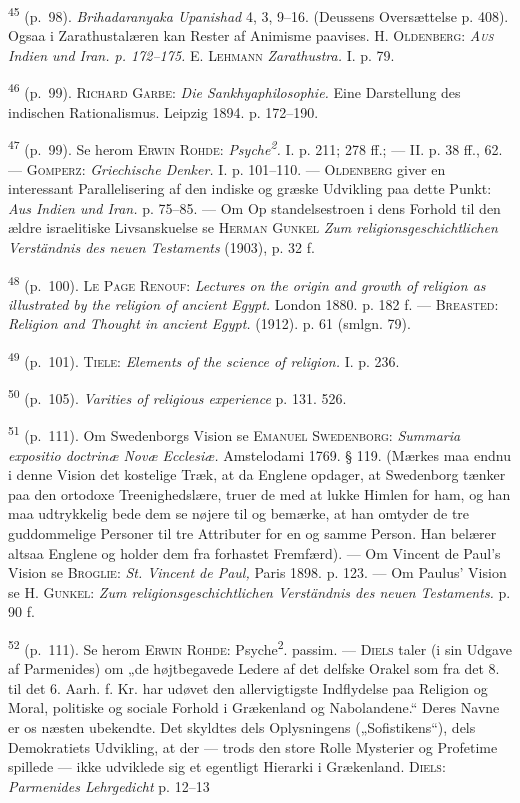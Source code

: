 \documentclass[12pt,a4paper,openany]{book}
\newcommand{\opage}[1]{\marginnote{\footnotesize\textit{[#1]}}}
\begin{document}
\begin{small}
\textsuperscript{45} (p.~98). \textit{Brihadaranyaka Upanishad} 4, 3,
9--16. (Deussens Oversættelse p.
408). Ogsaa i Zarathustalæren kan Rester af Animisme paavises. H.
\textsc{Oldenberg}: \textit{\textsc{Aus}} \textit{Indien und Iran. p.
172--175.} E. \textsc{Lehmann} \textit{Zarathustra.} I. p. 79.

\textsuperscript{46} (p.~99). \textsc{Richard Garbe}: \textit{Die
Sankhyaphilosophie.} Eine
Darstellung des indischen Rationalismus. Leipzig 1894. p. 172--190.

\textsuperscript{47} (p.~99). Se herom \textsc{Erwin Rohde}:
\textit{Psyche\textsuperscript{2}.} I. p.
211; 278 ff.; --- II. p. 38 ff., 62. --- \textsc{Gomperz}:
\textit{Griechische Denker.} I. p. 101--110. --- \textsc{Oldenberg}
giver en interessant Parallelisering af den indiske og græske Udvikling
paa dette Punkt: \textit{Aus Indien und Iran.} p. 75--85. --- Om Op%
\opage{250}standelsestroen i dens Forhold til den ældre israelitiske
Livsanskuelse se \textsc{Herman Gunkel} \textit{Zum
religionsgeschichtlichen Verständnis des neuen Testaments} (1903), p. 32
f.

\textsuperscript{48} (p.~100). \textsc{Le Page Renouf}: \textit{Lectures
on the origin and growth of
religion as illustrated by the religion of ancient Egypt.} London 1880.
p. 182 f. --- \textsc{Breasted}: \textit{Religion and Thought in ancient
Egypt.} (1912). p. 61 (smlgn. 79).

\textsuperscript{49} (p.~101). \textsc{Tiele}: \textit{Elements of the
science of religion.} I. p. 236.

\textsuperscript{50} (p.~105). \textit{Varities of religious experience}
p. 131. 526.

\textsuperscript{51} (p.~111). Om Swedenborgs Vision se \textsc{Emanuel
Swedenborg}: \textit{Summaria
expositio doctrinæ Novæ Ecclesiæ.} Amstelodami 1769. § 119. (Mærkes maa
endnu i denne Vision det kostelige Træk, at da Englene opdager, at
Swedenborg tænker paa den ortodoxe Treenighedslære, truer de med at
lukke Himlen for ham, og han maa udtrykkelig bede dem se nøjere til og
bemærke, at han omtyder de tre guddommelige Personer til tre Attributer
for en og samme Person. Han belærer altsaa Englene og holder dem fra
forhastet Fremfærd). --- Om Vincent de Paul’s Vision se
\textsc{Broglie}: \textit{St. Vincent de Paul,} Paris 1898. p. 123. ---
Om Paulus’ Vision se H. \textsc{Gunkel}: \textit{Zum
religionsgeschichtlichen Verständnis des neuen Testaments.} p. 90 f.

\textsuperscript{52} (p.~111). Se herom \textsc{Erwin Rohde}:
Psyche\textsuperscript{2}. passim. ---
\textsc{Diels} taler (i sin Udgave af Parmenides) om „de højtbegavede
Ledere af det delfske Orakel som fra det 8. til det 6. Aarh. f. Kr. har
udøvet den allervigtigste Indflydelse paa Religion og Moral, politiske
og sociale Forhold i Grækenland og Nabolandene.“ Deres Navne er os
næsten ubekendte. Det skyldtes dels Oplysningens („Sofistikens“), dels
Demokratiets Udvikling, at der --- trods den store Rolle Mysterier og
Profetime spillede --- ikke udviklede sig et egentligt Hierarki i
Grækenland. \textsc{Diels}: \textit{Parmenides Lehrgedicht} p. 12--13


\end{small}
\end{document}
